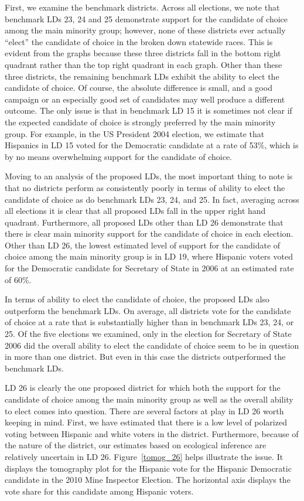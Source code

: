\documentclass[12pt]{article}
\begin{document}
First, we examine the benchmark districts. Across all elections, we
note that benchmark LDs 23, 24 and 25 demonstrate support for the
candidate of choice among the main minority group; however, none of
these districts ever actually ``elect'' the candidate of choice in
the broken down statewide races.  This is evident from the graphs
because these three districts fall in the bottom right quadrant rather
than the top right quadrant in each graph. Other than these three
districts, the remaining benchmark LDs exhibit the ability to elect
the candidate of choice.  Of course, the absolute difference is small,
and a good campaign or an especially good set of candidates may well
produce a different outcome.  The only issue is that in benchmark LD
15 it is sometimes not clear if the expected candidate of choice is
strongly preferred by the main minority group.  For example, in the US
President 2004 election, we estimate that Hispanics in LD 15 voted for
the Democratic candidate at a rate of 53\%, which is by no means
overwhelming support for the candidate of choice.

Moving to an analysis of the proposed LDs, the most important thing to
note is that no districts perform as consistently poorly in terms of
ability to elect the candidate of choice as do benchmark LDs 23, 24,
and 25. In fact, averaging across all elections it is clear that all
proposed LDs fall in the upper right hand quadrant. Furthermore, all
proposed LDs other than LD 26 demonstrate that there is clear main
minority support for the candidate of choice in each election. Other
than LD 26, the lowest estimated level of support for the candidate of
choice among the main minority group is in LD 19, where Hispanic
voters voted for the Democratic candidate for Secretary of State in
2006 at an estimated rate of 60\%.

In terms of ability to elect the candidate of choice, the proposed LDs
also outperform the benchmark LDs. On average, all districts vote for
the candidate of choice at a rate that is substantially higher than in
benchmark LDs 23, 24, or 25. Of the five elections we examined, only
in the election for Secretary of State 2006 did the overall ability to
elect the candidate of choice seem to be in question in more than one
district. But even in this case the districts outperformed the
benchmark LDs.

LD 26 is clearly the one proposed district for which both the support
for the candidate of choice among the main minority group as well as
the overall ability to elect comes into question. There are several
factors at play in LD 26 worth keeping in mind. First, we have
estimated that there is a low level of polarized voting between
Hispanic and white voters in the district. Furthermore, because of the
nature of the district, our estimates based on ecological inference
are relatively uncertain in LD 26. Figure~\ref{tomog_26} helps
illustrate the issue. It displays the tomography plot for the Hispanic
vote for the Hispanic Democratic candidate in the 2010 Mine Inspector
Election. The horizontal axis displays the vote share for this
candidate among Hispanic voters.
\end{document}

